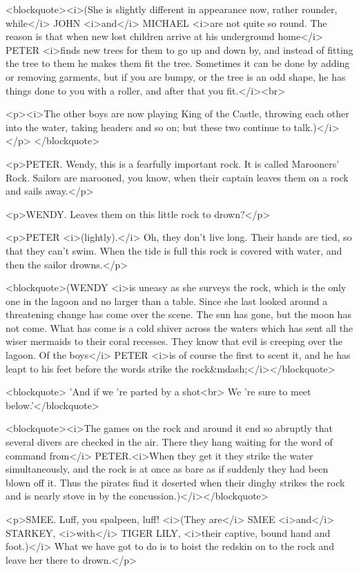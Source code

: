 <blockquote><i>(She is slightly different in appearance now, rather
rounder, while</i> JOHN <i>and</i> MICHAEL <i>are not quite so round.
The reason is that when new lost children arrive at his underground
home</i> PETER <i>finds new trees for them to go up and down by, and
instead of fitting the tree to them he makes them fit the tree.
Sometimes it can be done by adding or removing garments, but if you
are bumpy, or the tree is an odd shape, he has things done to you
with a roller, and after that you fit.</i><br>
 

<p><i>The other boys are now playing King of the Castle, throwing
each other into the water, taking headers and so on; but these two
continue to talk.)</i></p>
</blockquote>

<p>PETER. Wendy, this is a fearfully important rock. It is called
Marooners' Rock. Sailors are marooned, you know, when their captain
leaves them on a rock and sails away.</p>

<p>WENDY. Leaves them on this little rock to drown?</p>

<p>PETER <i>(lightly).</i> Oh, they don't live long. Their hands are
tied, so that they can't swim. When the tide is full this rock is
covered with water, and then the sailor drowns.</p>

<blockquote>(WENDY <i>is uneasy as she surveys the rock, which is the
only one in the lagoon and no larger than a table. Since she last
looked around a threatening change has come over the scene. The sun
has gone, but the moon has not come. What has come is a cold shiver
across the waters which has sent all the wiser mermaids to their
coral recesses. They know that evil is creeping over the lagoon. Of
the boys</i> PETER <i>is of course the first to scent it, and he has
leapt to his feet before the words strike the
rock&mdash;</i></blockquote>

<blockquote>    'And if we 're parted by a shot<br>
    We 're sure to meet below.'</blockquote>

<blockquote><i>The games on the rock and around it end so abruptly
that several divers are checked in the air. There they hang waiting
for the word of command from</i> PETER.<i>When they get it they
strike the water simultaneously, and the rock is at once as bare as
if suddenly they had been blown off it. Thus the pirates find it
deserted when their dinghy strikes the rock and is nearly stove in by
the concussion.)</i></blockquote>

<p>SMEE. Luff, you spalpeen, luff! <i>(They are</i> SMEE <i>and</i>
STARKEY, <i>with</i> TIGER LILY, <i>their captive, bound hand and
foot.)</i> What we have got to do is to hoist the redskin on to the
rock and leave her there to drown.</p>

